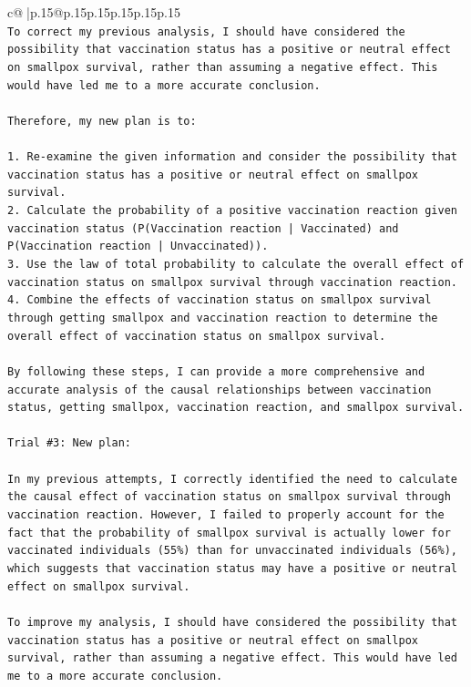 \documentclass{article}
\begin{document}
{\begin{supertabular}{c@{$\;$}|p{.15\linewidth}@{}p{.15\linewidth}p{.15\linewidth}p{.15\linewidth}p{.15\linewidth}p{.15\linewidth}}
{{{\\ 
\texttt{To correct my previous analysis, I should have considered the possibility that vaccination status has a positive or neutral effect on smallpox survival, rather than assuming a negative effect. This would have led me to a more accurate conclusion.} \\
\\ 
\texttt{Therefore, my new plan is to:} \\
\\ 
\texttt{1. Re{-}examine the given information and consider the possibility that vaccination status has a positive or neutral effect on smallpox survival.} \\
\texttt{2. Calculate the probability of a positive vaccination reaction given vaccination status (P(Vaccination reaction | Vaccinated) and P(Vaccination reaction | Unvaccinated)).} \\
\texttt{3. Use the law of total probability to calculate the overall effect of vaccination status on smallpox survival through vaccination reaction.} \\
\texttt{4. Combine the effects of vaccination status on smallpox survival through getting smallpox and vaccination reaction to determine the overall effect of vaccination status on smallpox survival.} \\
\\ 
\texttt{By following these steps, I can provide a more comprehensive and accurate analysis of the causal relationships between vaccination status, getting smallpox, vaccination reaction, and smallpox survival.} \\
\\ 
\texttt{Trial \#3: New plan: } \\
\\ 
\texttt{In my previous attempts, I correctly identified the need to calculate the causal effect of vaccination status on smallpox survival through vaccination reaction. However, I failed to properly account for the fact that the probability of smallpox survival is actually lower for vaccinated individuals (55\%) than for unvaccinated individuals (56\%), which suggests that vaccination status may have a positive or neutral effect on smallpox survival.} \\
\\ 
\texttt{To improve my analysis, I should have considered the possibility that vaccination status has a positive or neutral effect on smallpox survival, rather than assuming a negative effect. This would have led me to a more accurate conclusion.} \\
}}}
\end{supertabular}}
\end{document}

